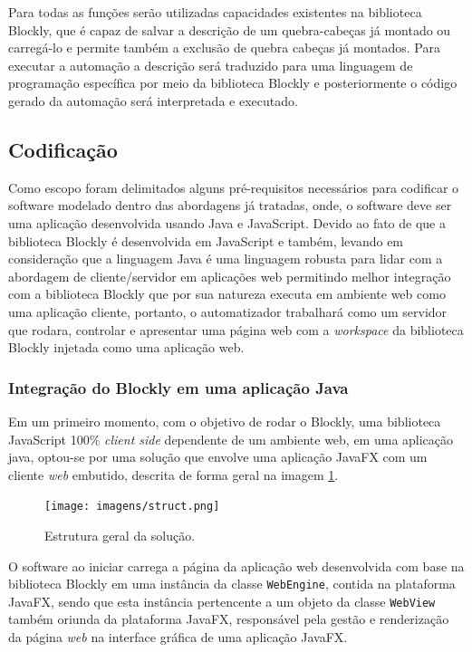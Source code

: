 \documentclass[tg]{mdtufsm}
\begin{document}
                Para todas as funções serão utilizadas capacidades existentes na biblioteca Blockly, que é capaz de salvar a descrição de um quebra-cabeças já montado ou carregá-lo e permite também a exclusão de quebra cabeças já montados. Para executar a automação a descrição será traduzido para uma linguagem de programação específica por meio da biblioteca Blockly e posteriormente o código gerado da automação será interpretada e executado.

            \subsection {Codificação}

                Como escopo foram delimitados alguns pré-requisitos necessários para codificar o software modelado dentro das abordagens já tratadas, onde, o software deve ser uma aplicação desenvolvida usando Java e JavaScript. Devido ao fato de que a biblioteca Blockly é desenvolvida em JavaScript e também, levando em consideração que a linguagem Java é uma linguagem robusta para lidar com a abordagem de cliente/servidor em aplicações web permitindo melhor integração com a biblioteca Blockly que por sua natureza executa em ambiente web como uma aplicação cliente, portanto, o automatizador trabalhará como um servidor que rodara, controlar e apresentar uma página web com a \emph{workspace} da biblioteca Blockly injetada como uma aplicação web.

                \subsubsection {Integração do Blockly em uma aplicação Java}

                    Em um primeiro momento, com o objetivo de rodar o Blockly, uma biblioteca JavaScript 100\% \emph{client side} dependente de um ambiente web, em uma aplicação java, optou-se por uma solução que envolve uma aplicação JavaFX com um cliente \emph{web} embutido, descrita de forma geral na imagem \ref{fig:struct}.

                    \begin{figure}[!htb]
                        {\centering
                        \texttt{[image: imagens/struct.png]}
                        \caption{Estrutura geral da solução.}
                        \label{fig:struct}}
                    \end{figure}

                    O software ao iniciar carrega a página da aplicação web desenvolvida com base na biblioteca Blockly em uma instância da classe \texttt{WebEngine}, contida na plataforma JavaFX, sendo que esta instância pertencente a um objeto da classe \texttt{WebView} também oriunda da plataforma JavaFX, responsável pela gestão e renderização da página \emph{web} na interface gráfica de uma aplicação JavaFX.
\end{document}
